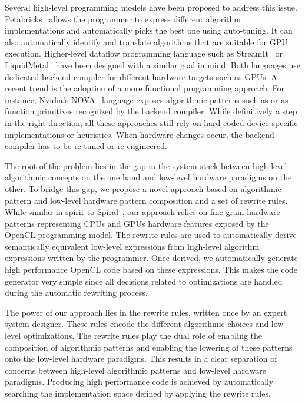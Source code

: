 Several high-level programming models have been proposed to address this issue.
Petabricks~\cite{PhothilimthanaARA13} allows the programmer to express different algorithm implementations and automatically picks the best one using auto-tuning.
It can also automatically identify and translate algorithms that are suitable for GPU execution.
Higher-level dataflow programming language such as StreamIt~\cite{HormatiSWMM11} or LiquidMetal~\cite{DubachCRBF12} have been designed with a similar goal in mind.
Both languages use dedicated backend compiler for different hardware targets such as GPUs.
A recent trend is the adoption of a more functional programming approach. 
For instance, Nvidia's NOVA~\cite{CollinsGGLS14} language exposes algorithmic patterns such as  or  as function primitives recognized by the backend compiler.
While definitively a step in the right direction, all these approaches still rely on hard-coded device-specific implementations or heuristics.
When hardware changes occur, the backend compiler has to be re-tuned or re-engineered.%

The root of the problem lies in the gap in the system stack between high-level algorithmic concepts on the one hand and low-level hardware paradigms on the other.
To bridge this gap, we propose a novel approach based on algorithmic pattern and low-level hardware pattern composition and a set of rewrite rules.
While similar in spirit to Spiral~\cite{PueschelMJPVSXFGVCJR2005}, our approach relies on fine grain hardware patterns representing CPUs and GPUs hardware features exposed by the OpenCL programming model.
The rewrite rules are used to automatically derive semantically equivalent low-level expressions from high-level algorithm expressions written by the programmer.
Once derived, we automatically generate high performance OpenCL code based on these expressions.
This makes the code generator very simple since all decisions related to optimizations are handled during the automatic rewriting process.

The power of our approach lies in the rewrite rules, written once by an expert system designer.
These rules encode the different algorithmic choices and low-level optimizations.
The rewrite rules play the dual role of enabling the composition of algorithmic patterns and enabling the lowering of these patterns onto the low-level hardware paradigms.
This results in a clear separation of concerns between high-level algorithmic patterns and low-level hardware paradigms.
Producing high performance code is achieved by automatically searching the implementation space defined by applying the rewrite rules.

